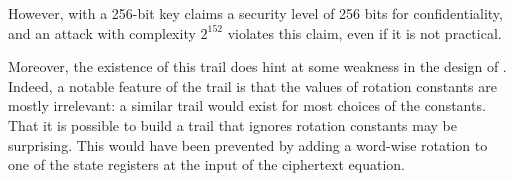However,  with a 256-bit key claims a security level
of 256 bits for confidentiality, and an attack with complexity $2^{152}$
violates this claim, even if it is not practical.  

Moreover, the existence of this trail does hint at some weakness in the
design of . Indeed, a notable feature of the trail is that
the values of rotation constants are mostly irrelevant: a similar trail
would exist for most choices of the constants. That it is possible to
build a trail that ignores rotation constants may be surprising. This
would have been prevented by adding a word-wise rotation to one of the
state registers at the input of the ciphertext equation.

